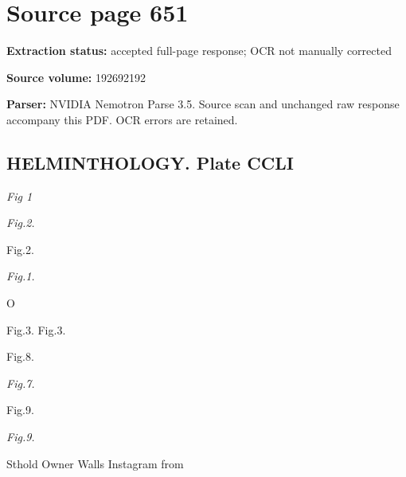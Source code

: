 \clearpage
\section{Source page 651}
\textbf{Extraction status:} accepted full-page response; OCR not manually corrected\par
\textbf{Source volume:} 192692192\par
\textbf{Parser:} NVIDIA Nemotron Parse 3.5. Source scan and unchanged raw response accompany this PDF. OCR errors are retained.\par\medskip
\subsection*{HELMINTHOLOGY. Plate CCLI}
{\small\itshape Fig 1\par}\medskip
{\small\itshape Fig.2.\par}\medskip
Fig.2.\par\medskip
{\small\itshape Fig.1.\par}\medskip
O\par\medskip
Fig.3. Fig.3.\par\medskip
Fig.8.\par\medskip
{\small\itshape Fig.7.\par}\medskip
Fig.9.\par\medskip
{\small\itshape Fig.9.\par}\medskip
Sthold Owner Walls Instagram from\par\medskip
